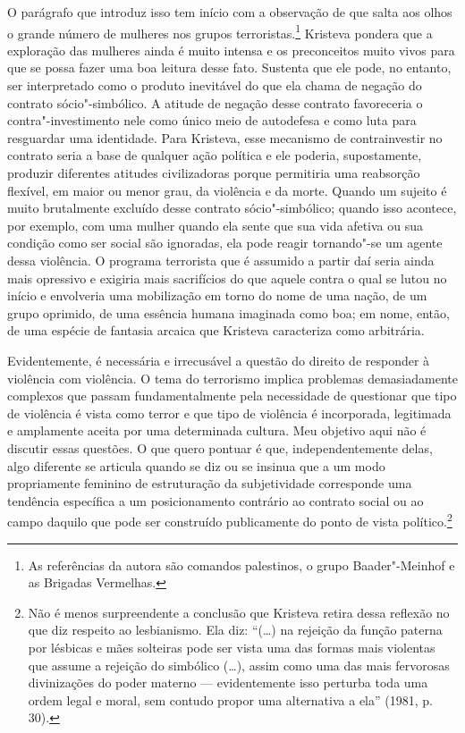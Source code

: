 O parágrafo que introduz isso tem início com a observação de que salta
aos olhos o grande número de mulheres nos grupos terroristas.\footnote{As
  referências da autora são comandos palestinos, o grupo Baader"-Meinhof
  e as Brigadas Vermelhas.} Kristeva pondera que a exploração das
mulheres ainda é muito intensa e os preconceitos muito vivos para que se
possa fazer uma boa leitura desse fato. Sustenta que ele pode, no
entanto, ser interpretado como o produto inevitável do que ela chama de
negação do contrato sócio"-simbólico. A atitude de negação desse contrato
favoreceria o contra"-investimento nele como único meio de autodefesa e
como luta para resguardar uma identidade. Para Kristeva, esse mecanismo
de contrainvestir no contrato seria a base de qualquer ação política e
ele poderia, supostamente, produzir diferentes atitudes civilizadoras
porque permitiria uma reabsorção flexível, em maior ou menor grau, da
violência e da morte. Quando um sujeito é muito brutalmente excluído
desse contrato sócio"-simbólico; quando isso acontece, por exemplo, com
uma mulher quando ela sente que sua vida afetiva ou sua condição como
ser social são ignoradas, ela pode reagir tornando"-se um agente dessa
violência. O programa terrorista que é assumido a partir daí seria ainda
mais opressivo e exigiria mais sacrifícios do que aquele contra o qual
se lutou no início e envolveria uma mobilização em torno do nome de uma
nação, de um grupo oprimido, de uma essência humana imaginada como boa;
em nome, então, de uma espécie de fantasia arcaica que Kristeva
caracteriza como arbitrária.

Evidentemente, é necessária e irrecusável a questão do direito de
responder à violência com violência. O tema do terrorismo implica
problemas demasiadamente complexos que passam fundamentalmente pela
necessidade de questionar que tipo de violência é vista como terror e
que tipo de violência é incorporada, legitimada e amplamente aceita por
uma determinada cultura. Meu objetivo aqui não é discutir essas
questões. O que quero pontuar é que, independentemente delas, algo
diferente se articula quando se diz ou se insinua que a um modo
propriamente feminino de estruturação da subjetividade corresponde uma
tendência específica a um posicionamento contrário ao contrato social ou
ao campo daquilo que pode ser construído publicamente do ponto de vista
político.\footnote{Não é menos surpreendente a conclusão que Kristeva
  retira dessa reflexão no que diz respeito ao lesbianismo. Ela diz:
  ``(\ldots{}) na rejeição da função paterna por lésbicas e mães
      solteiras pode ser vista uma das formas mais violentas que assume a
      rejeição do simbólico (\ldots{}), assim como uma das mais fervorosas
      divinizações do poder materno --- evidentemente isso perturba toda uma
      ordem legal e moral, sem contudo propor uma alternativa a ela''
  (1981, p. 30).}


